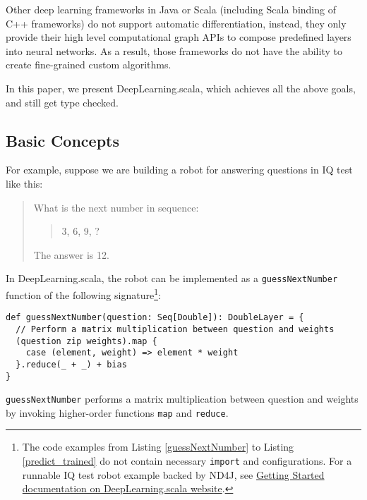 Other deep learning frameworks in Java or Scala (including Scala binding of C++ frameworks)\cite{intel2016bigdl,skymind2017deeplearning4j,baydin2016hype,chen2017typesafe} do not support automatic differentiation, instead, they only provide their high level computational graph APIs to compose predefined layers into neural networks. As a result, those frameworks do not have the ability to create fine-grained custom algorithms.

In this paper, we present DeepLearning.scala, which achieves all the above goals, and still get type checked.

\subsection{Basic Concepts\label{concepts}}

For example, suppose we are building a robot for answering questions in IQ test like this:

\begin{quote}
  What is the next number in sequence:
    \begin{quote}
    3, 6, 9, ?
    \end{quote}
  The answer is 12.
\end{quote}

In DeepLearning.scala, the robot can be implemented as a \lstinline{guessNextNumber} function of the following signature\footnote{The code examples from Listing \ref{guessNextNumber} to Listing \ref{predict_trained} do not contain necessary \lstinline{import} and configurations. For a runnable IQ test robot example backed by ND4J\cite{skymind2017nd4j}, see \href{http://deeplearning.thoughtworks.school/demo/GettingStarted.html}{Getting Started documentation on DeepLearning.scala website}.}:

\begin{lstlisting}[caption={The differentiable matrix multiplication implemented by \lstinline{map}/\lstinline{reduce}},label={guessNextNumber}]
def guessNextNumber(question: Seq[Double]): DoubleLayer = {
  // Perform a matrix multiplication between question and weights
  (question zip weights).map {
    case (element, weight) => element * weight
  }.reduce(_ + _) + bias
}
\end{lstlisting}

\lstinline{guessNextNumber} performs a matrix multiplication between question and weights by invoking higher-order functions \lstinline{map} and \lstinline{reduce}. 

